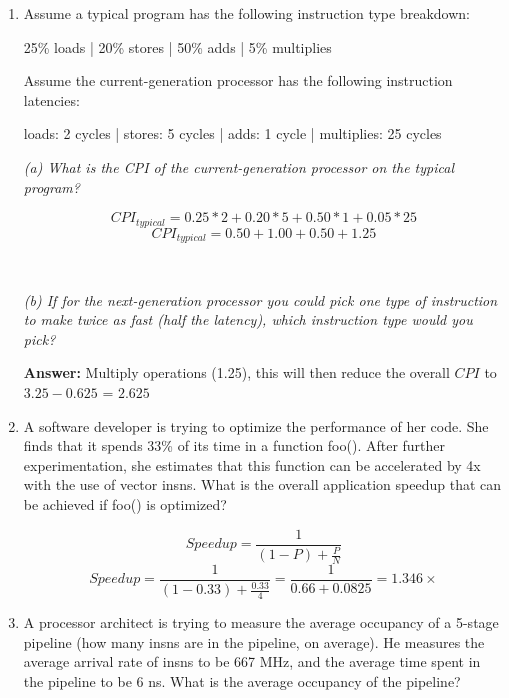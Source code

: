 \documentclass[12pt]{article}
\newenvironment{QandA}{\begin{enumerate}[label=\bfseries\alph*.]\bfseries}
                      {\end{enumerate}}
\newenvironment{answered}{\par\quad\normalfont}{}
\begin{document}
\begin{QandA}
   \item Assume a typical program has the following instruction type breakdown:
   
    25\% loads | 20\% stores | 50\% adds | 5\% multiplies

    Assume the current-generation processor has the following instruction latencies:
    
    loads: 2 cycles | stores: 5 cycles | adds: 1 cycle | multiplies: 25 cycles

    \begin{answered}
    
    \textit{(a) What is the CPI of the current-generation processor on the typical program?}
    
    \begin{equation*}
        CPI_{typical} = 0.25 * 2 + 0.20 * 5 + 0.50 * 1 + 0.05 * 25
    \end{equation*}
    \begin{equation*}
        CPI_{typical} = 0.50 + 1.00 + 0.50 + 1.25
    \end{equation*}    
    
    \ 
    
    \textit{(b) If for the next-generation processor you could pick one type of instruction to
make twice as fast (half the latency), which instruction type would you pick?}

    \textbf{Answer:} Multiply operations (1.25), this will then reduce the overall $CPI$ to $3.25 - 0.625$ = $2.625$ 
    \end{answered}
    
    \item A software developer is trying to optimize the performance of her code. She finds that it spends 33\% of its time in a function foo(). After further experimentation, she estimates that this function can be accelerated by 4x with the use of vector insns. What is the overall application speedup that can be achieved if foo() is optimized?
    
    \begin{equation*}
    Speedup = \frac{1}{(1-P)+\frac{P}{N}}    
    \end{equation*}
    \begin{equation*}
    Speedup = \frac{1}{(1-0.33)+\frac{0.33}{4}} = \frac{1}{0.66+0.0825} = 1.346\times
    \end{equation*}
    
    \item A processor architect is trying to measure the average occupancy of a 5-stage pipeline (how many insns are in the pipeline, on average). He measures the average arrival rate of insns to be 667 MHz, and the average time spent in the pipeline to be 6 ns. What is the average occupancy of the pipeline?
    

\end{QandA}
\end{document}
